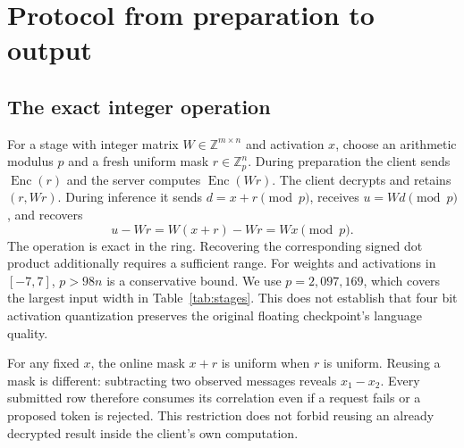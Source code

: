 \documentclass[10pt,twocolumn]{article}
\begin{document}
\section{Protocol from preparation to output}
\subsection{The exact integer operation}
For a stage with integer matrix $W\in\mathbb Z^{m\times n}$ and activation $x$,
choose an arithmetic modulus $p$ and a fresh uniform mask $r\in\mathbb Z_p^n$.
During preparation the client sends $\operatorname{Enc}(r)$ and the server
computes $\operatorname{Enc}(Wr)$. The client decrypts and retains $(r,Wr)$.
During inference it sends $d=x+r\pmod p$, receives $u=Wd\pmod p$, and recovers
\begin{equation}
 u-Wr = W(x+r)-Wr = Wx \pmod p.
\end{equation}
The operation is exact in the ring. Recovering the corresponding signed dot
product additionally requires a sufficient range. For weights and activations
in $[-7,7]$, $p>98n$ is a conservative bound. We use $p=2,097,169$, which covers
the largest input width in Table~\ref{tab:stages}. This does not establish that
four bit activation quantization preserves the original floating checkpoint's
language quality.

For any fixed $x$, the online mask $x+r$ is uniform when $r$ is uniform. Reusing
a mask is different: subtracting two observed messages reveals
$x_1-x_2$. Every submitted row therefore consumes its correlation even if a
request fails or a proposed token is rejected. This restriction does not forbid
reusing an already decrypted result inside the client's own computation.
\end{document}
